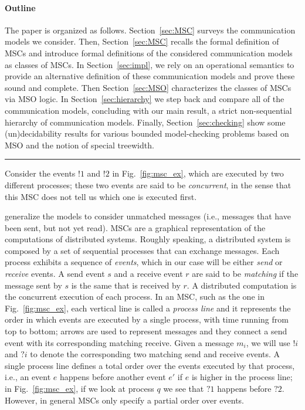 \paragraph{\bf Outline} The paper is organized as follows. Section~\ref{sec:MSC} surveys the communication models we consider.  Then, Section~\ref{sec:MSC} recalls the formal definition of MSCs and introduce formal definitions of the considered communication models as classes of MSCs.
In Section~\ref{sec:impl}, we rely on
an operational semantics to provide an alternative definition of these communication models and prove these sound and complete.
Then Section~\ref{sec:MSO} characterizes the classes of MSCs via MSO logic.
In Section~\ref{sec:hierarchy} we step back and compare all of the communication models, concluding with our main result, a strict non-sequential hierarchy of communication models.
Finally, Section~\ref{sec:checking} show some (un)decidability results for various bounded model-checking
problems based on MSO and the notion of special treewidth.


\hrule

\bigskip


Consider the events $!1$ and $!2$ in Fig.~\ref{fig:msc_ex}, which are executed by two different processes; these two events are said to be \emph{concurrent}, in the sense that this MSC does not tell us which one is executed first.

generalize the models to  consider unmatched messages (i.e., messages that have been sent, but not yet read).
MSCs are a graphical representation of the  computations of distributed systems.  Roughly speaking, a distributed system is composed by a set of sequential processes that can exchange messages. Each process exhibits a sequence of \emph{events}, which in our case will be either \emph{send} or \emph{receive} events. A send event $s$ and a receive event $r$ are said to be \emph{matching} if the message sent by $s$ is the same  that is received by $r$. A distributed computation is the concurrent execution of each process. In an MSC, such as the one in Fig.~\ref{fig:msc_ex}, each vertical line is called a \emph{process line} and it represents the order in which events are executed by a single process, with time running from top to bottom; arrows are used to represent messages and they connect a send event with its corresponding matching receive.
Given a message $m_i$, we will use $!i$ and $?i$ to denote the corresponding two matching send and receive events. A single process line defines a total order over the events executed by that process, i.e., an event $e$ happens before another event $e'$ if $e$ is higher in the process line; in Fig.~\ref{fig:msc_ex}, if we look at process $q$ we see that $?1$ happens before $?2$. However, in general MSCs only specify a partial order over events.


